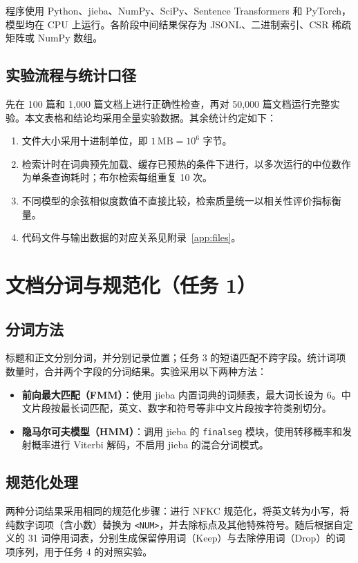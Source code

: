 \documentclass[UTF8,a4paper,11pt,fontset=fandol]{ctexart}
\begin{document}
程序使用 Python、jieba、NumPy、SciPy、Sentence Transformers 和 PyTorch，模型均在 CPU 上运行。各阶段中间结果保存为 JSONL、二进制索引、CSR 稀疏矩阵或 NumPy 数组。

\subsection{实验流程与统计口径}

先在 100 篇和 1,000 篇文档上进行正确性检查，再对 50,000 篇文档运行完整实验。本文表格和结论均采用全量实验数据。其余统计约定如下：
\begin{enumerate}
  \item 文件大小采用十进制单位，即 \(1\,\mathrm{MB}=10^6\) 字节。
  \item 检索计时在词典预先加载、缓存已预热的条件下进行，以多次运行的中位数作为单条查询耗时；布尔检索每组重复 10 次。
  \item 不同模型的余弦相似度数值不直接比较，检索质量统一以相关性评价指标衡量。
  \item 代码文件与输出数据的对应关系见附录~\ref{app:files}。
\end{enumerate}


\section{文档分词与规范化（任务 1）}
\subsection{分词方法}
标题和正文分别分词，并分别记录位置；任务 3 的短语匹配不跨字段。统计词项数量时，合并两个字段的分词结果。实验采用以下两种方法：
\begin{itemize}
  \item \textbf{前向最大匹配（FMM）}：使用 jieba 内置词典的词频表，最大词长设为 6。中文片段按最长词匹配，英文、数字和符号等非中文片段按字符类别切分。
  \item \textbf{隐马尔可夫模型（HMM）}：调用 jieba 的 \texttt{finalseg} 模块，使用转移概率和发射概率进行 Viterbi 解码，不启用 jieba 的混合分词模式。
\end{itemize}

\subsection{规范化处理}
两种分词结果采用相同的规范化步骤：进行 NFKC 规范化，将英文转为小写，将纯数字词项（含小数）替换为 \texttt{<NUM>}，并去除标点及其他特殊符号。随后根据自定义的 31 词停用词表，分别生成保留停用词（Keep）与去除停用词（Drop）的词项序列，用于任务 4 的对照实验。
\end{document}
